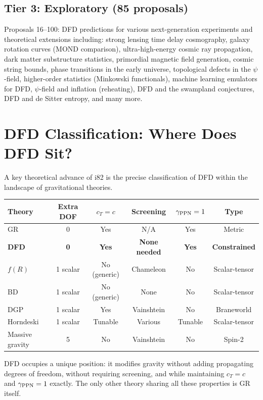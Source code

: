 \documentclass[11pt,a4paper]{article}
\begin{document}
\subsection{Tier 3: Exploratory (85 proposals)}

Proposals 16--100: DFD predictions for various next-generation experiments and theoretical extensions including: strong lensing time delay cosmography, galaxy rotation curves (MOND comparison), ultra-high-energy cosmic ray propagation, dark matter substructure statistics, primordial magnetic field generation, cosmic string bounds, phase transitions in the early universe, topological defects in the $\psi$-field, higher-order statistics (Minkowski functionals), machine learning emulators for DFD, $\psi$-field and inflation (reheating), DFD and the swampland conjectures, DFD and de Sitter entropy, and many more.

\section{DFD Classification: Where Does DFD Sit?}

A key theoretical advance of i82 is the precise classification of DFD within the landscape of gravitational theories.

\begin{center}
\begin{tabular}{lccccc}
\toprule
\textbf{Theory} & \textbf{Extra DOF} & $c_T = c$ & \textbf{Screening} & \textbf{$\gamma_{\rm PPN} = 1$} & \textbf{Type} \\
\midrule
GR & 0 & Yes & N/A & Yes & Metric \\
\textbf{DFD} & \textbf{0} & \textbf{Yes} & \textbf{None needed} & \textbf{Yes} & \textbf{Constrained} \\
$f(R)$ & 1 scalar & No (generic) & Chameleon & No & Scalar-tensor \\
BD & 1 scalar & No (generic) & None & No & Scalar-tensor \\
DGP & 1 scalar & Yes & Vainshtein & No & Braneworld \\
Horndeski & 1 scalar & Tunable & Various & Tunable & Scalar-tensor \\
Massive gravity & 5 & No & Vainshtein & No & Spin-2 \\
\bottomrule
\end{tabular}
\end{center}

DFD occupies a unique position: it modifies gravity without adding propagating degrees of freedom, without requiring screening, and while maintaining $c_T = c$ and $\gamma_{\rm PPN} = 1$ exactly. The only other theory sharing all these properties is GR itself.
\end{document}
